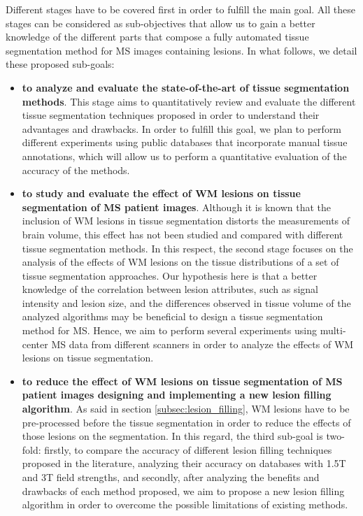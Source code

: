 Different stages have to be covered first in order to fulfill the main goal. All these stages can be considered as sub-objectives that allow us to gain a better knowledge of the different parts that compose a fully automated tissue segmentation method for MS images containing lesions. In what follows, we detail these proposed sub-goals: 

\begin{itemize}

\item \textbf{to analyze and evaluate the state-of-the-art of tissue segmentation methods}. This stage aims to quantitatively review and evaluate the different tissue segmentation techniques proposed in order to understand their advantages and drawbacks. In order to fulfill this goal, we plan to perform different experiments using public databases that incorporate manual tissue annotations, which will allow us to perform a quantitative evaluation of the accuracy of the methods. 
  
\item \textbf{to study and evaluate the effect of WM lesions on tissue segmentation of MS patient images}. Although it is known that the inclusion of WM lesions in tissue segmentation distorts the measurements of brain volume, this effect has not been studied and compared with different tissue segmentation methods. In this respect, the second stage focuses on the analysis of the effects of WM lesions on the tissue distributions of a set of tissue segmentation approaches. Our hypothesis here is that a better knowledge of the correlation between lesion attributes, such as signal intensity and lesion size, and the differences observed in tissue volume of the analyzed algorithms may be beneficial to design a tissue segmentation method for MS. Hence, we aim to perform several experiments using multi-center MS data from different scanners in order to analyze the effects of WM lesions on tissue segmentation.

\item \textbf{to reduce the effect of WM lesions on tissue segmentation of MS patient images designing and implementing a new lesion filling algorithm}. As said in section \ref{subsec:lesion_filling}, WM lesions have to be pre-processed before the tissue segmentation in order to reduce the effects of those lesions on the segmentation. In this regard, the third sub-goal is two-fold: firstly, to compare the accuracy of different lesion filling techniques proposed in the literature, analyzing their accuracy on databases with 1.5T and 3T field strengths, and secondly, after analyzing the benefits and drawbacks of each method proposed, we aim to propose a new lesion filling algorithm in order to overcome the possible limitations of existing methods.


\end{itemize}
